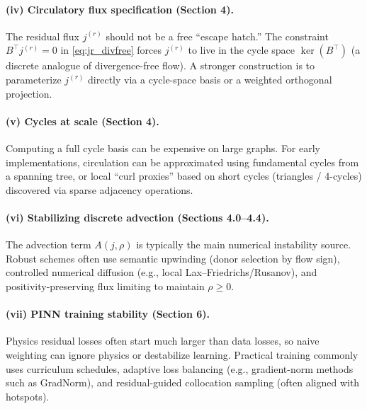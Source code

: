\documentclass[11pt]{article}
\begin{document}
\paragraph{(iv) Circulatory flux specification (Section 4).}
The residual flux $j^{(r)}$ should not be a free ``escape hatch.'' The constraint $B^\top j^{(r)}=0$ in \eqref{eq:jr_divfree} forces $j^{(r)}$ to live
in the cycle space $\ker(B^\top)$ (a discrete analogue of divergence-free flow). A stronger construction is to parameterize $j^{(r)}$ directly via a
cycle-space basis or a weighted orthogonal projection.

\paragraph{(v) Cycles at scale (Section 4).}
Computing a full cycle basis can be expensive on large graphs. For early implementations, circulation can be approximated using fundamental cycles
from a spanning tree, or local ``curl proxies'' based on short cycles (triangles / 4-cycles) discovered via sparse adjacency operations.

\paragraph{(vi) Stabilizing discrete advection (Sections 4.0--4.4).}
The advection term $A(j,\rho)$ is typically the main numerical instability source. Robust schemes often use semantic upwinding (donor selection by flow sign),
controlled numerical diffusion (e.g., local Lax--Friedrichs/Rusanov), and positivity-preserving flux limiting to maintain $\rho\ge 0$.

\paragraph{(vii) PINN training stability (Section 6).}
Physics residual losses often start much larger than data losses, so naive weighting can ignore physics or destabilize learning. Practical training commonly uses
curriculum schedules, adaptive loss balancing (e.g., gradient-norm methods such as GradNorm), and residual-guided collocation sampling (often aligned with hotspots).
\end{document}
